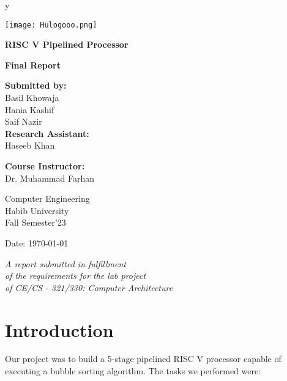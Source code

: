 y\documentclass[12pt]{article}
\begin{document}
\begin{titlepage}
    \begin{center}
        \texttt{[image: Hulogooo.png]} 
        \vspace{1cm}

        \LARGE
        \textbf{RISC V Pipelined Processor}

        \vspace{1.5cm}
        \Large
        \textbf{Final Report}

        \vspace{2cm}
        \large
        \textbf{Submitted by:}\\
        Basil Khowaja \\
        Hania Kashif \\
        Saif Nazir\\

        \vspace{0.5cm}
        \large
        \textbf{Research Assistant:}\\
        Haseeb Khan

        \vspace{0.5cm}
        \large
       \textbf{ Course Instructor:}\\
       Dr. Muhammad Farhan

        \vspace{1cm}
        \large
        Computer Engineering\\ Habib University\\
        Fall Semester'23

        \vspace{1cm}
        \large
        Date: \today 

        \vfill
        \small
        \textit{A report submitted in fulfillment\\
        of the requirements for the lab project\\ of 
        CE/CS - 321/330: Computer Architecture}

    \end{center}
\end{titlepage}
\tableofcontents

\newpage



\section{Introduction}\label{sec:intro}
Our project was to build a 5-stage pipelined RISC V processor capable of executing a bubble sorting algorithm. The tasks we performed were:
\end{document}
